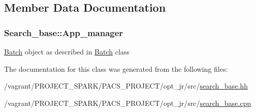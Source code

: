 \subsection{Member Data Documentation}
\hypertarget{classSearch__base_ad4cadf0273cce78e1ae9920bd9100e7a}{
\subsubsection[{App\-\_\-manager}]{ Search\-\_\-base\-::\-App\-\_\-manager\hspace{0.3cm}{\ttfamily [protected]}}}\label{classSearch__base_ad4cadf0273cce78e1ae9920bd9100e7a}
\hyperlink{classBatch}{Batch} object as described in \hyperlink{classBatch}{Batch} class 

The documentation for this class was generated from the following files\-:\begin{DoxyCompactItemize}
\item 
/vagrant/\-P\-R\-O\-J\-E\-C\-T\-\_\-\-S\-P\-A\-R\-K/\-P\-A\-C\-S\-\_\-\-P\-R\-O\-J\-E\-C\-T/opt\-\_\-jr/src/\hyperlink{search__base_8hh}{search\-\_\-base.\-hh}\item 
/vagrant/\-P\-R\-O\-J\-E\-C\-T\-\_\-\-S\-P\-A\-R\-K/\-P\-A\-C\-S\-\_\-\-P\-R\-O\-J\-E\-C\-T/opt\-\_\-jr/src/\hyperlink{search__base_8cpp}{search\-\_\-base.\-cpp}\end{DoxyCompactItemize}
